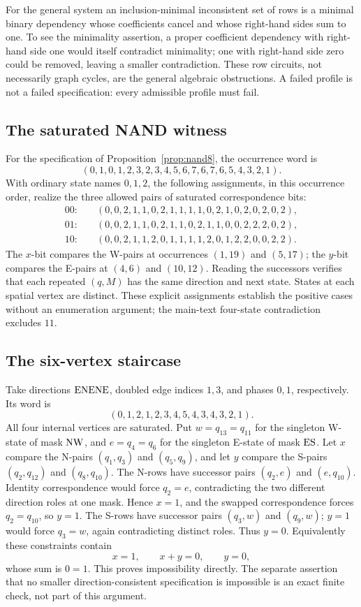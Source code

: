 For the general system an inclusion-minimal inconsistent set of rows is a
minimal binary dependency whose coefficients cancel and whose right-hand sides
sum to one. To see the minimality assertion, a proper coefficient dependency
with right-hand side one would itself contradict minimality; one with right-hand
side zero could be removed, leaving a smaller contradiction. These row circuits,
not necessarily graph cycles, are the general algebraic obstructions. A failed
profile is not a failed specification: every admissible profile must fail.

\subsection{The saturated NAND witness}
\label{app:nand-witnesses}
For the specification of Proposition~\ref{prop:nand8}, the occurrence word is
\[
(0,1,0,1,2,3,2,3,4,5,6,7,6,7,6,5,4,3,2,1).
\]
With ordinary state names $0,1,2$, the following assignments, in this occurrence
order, realize the three allowed pairs of saturated correspondence bits:
\begin{align*}
00:\quad &(0,0,2,1,1,0,2,1,1,1,1,0,2,1,0,2,0,2,0,2),\\
01:\quad &(0,0,2,1,1,0,2,1,1,0,2,1,1,0,0,2,2,2,0,2),\\
10:\quad &(0,0,2,1,1,2,0,1,1,1,1,2,0,1,2,2,0,0,2,2).
\end{align*}
The $x$-bit compares the W-pairs at occurrences $(1,19)$ and $(5,17)$;
the $y$-bit compares the E-pairs at $(4,6)$ and $(10,12)$. Reading the successors
verifies that each repeated $(q,M)$ has the same direction and next state.
States at each spatial vertex are distinct. These explicit assignments establish
the positive cases without an enumeration argument; the main-text four-state
contradiction excludes $11$.

\subsection{The six-vertex staircase}
\label{app:staircase}
Take directions $\mathrm{E}\mathrm{N}\mathrm{E}\mathrm{N}\mathrm{E}$, doubled edge indices $1,3$, and phases $0,1$,
respectively. Its word is
\[
 (0,1,2,1,2,3,4,5,4,3,4,3,2,1).
\]
All four internal vertices are saturated. Put $w=q_{13}=q_{11}$ for the
singleton W-state of mask $\mathrm{N}\mathrm{W}$, and $e=q_4=q_6$ for the singleton E-state
of mask $\mathrm{E}\mathrm{S}$. Let $x$ compare the N-pairs $(q_1,q_3)$ and $(q_5,q_9)$,
and let $y$ compare the S-pairs $(q_2,q_{12})$ and $(q_8,q_{10})$.
The N-rows have successor pairs $(q_2,e)$ and $(e,q_{10})$.
Identity correspondence would force $q_2=e$, contradicting the two different
direction roles at one mask. Hence $x=1$, and the swapped correspondence forces
$q_2=q_{10}$, so $y=1$. The S-rows have successor pairs $(q_3,w)$ and $(q_9,w)$;
$y=1$ would force $q_3=w$, again contradicting distinct roles. Thus $y=0$.
Equivalently these constraints contain
\[
 x=1,\qquad x+y=0,\qquad y=0,
\]
whose sum is $0=1$. This proves impossibility directly. The separate assertion
that no smaller direction-consistent specification is impossible is an exact
finite check, not part of this argument.

